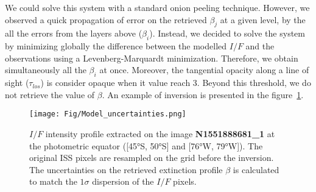 We could solve this system with a standard onion peeling technique.
However, we observed a quick propagation of error on the retrieved $\beta_j$ at a given level, by the all the errors from the
layers above ($\beta_i$).
Instead, we decided to solve the system by minimizing globally the difference between the modelled $I/F$ and the observations
using a Levenberg-Marquardt minimization. Therefore, we obtain simultaneously all the $\beta_i$ at once.
Moreover, the tangential opacity along a line of sight ($\tau_{los}$) is consider opaque when it value reach 3.
Beyond this threshold, we do not retrieve the value of $\beta$.
An example of inversion is presented in the figure~\ref{fig:model_uncertainties}.

\begin{figure}[!ht]
    \centering
    \texttt{[image: Fig/Model\_uncertainties.png]}
    \caption{$I/F$ intensity profile extracted on the image \textbf{N1551888681\_1} at the photometric
             equator ([\ang{45}S, \ang{50}S] and [\ang{76}W, \ang{79}W]). The original ISS pixels
             are resampled on the grid before the inversion. The uncertainties on the retrieved
             extinction profile $\beta$ is calculated to match the $1 \sigma$ dispersion of the
             $I/F$ pixels.}
    \label{fig:model_uncertainties}
\end{figure}
